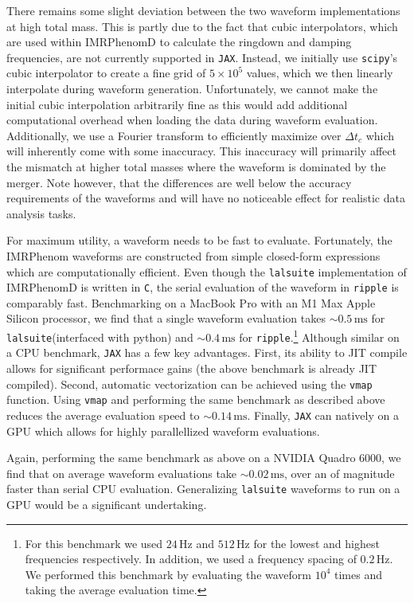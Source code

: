 \documentclass[twocolumn]{aastex631}
\newcommand{\jax}{\texttt{JAX}\xspace}
\newcommand{\ripple}{\texttt{ripple}\xspace}
\newcommand{\lalsuite}{\texttt{lalsuite}\xspace}
\begin{document}
There remains some slight deviation between the two waveform implementations at high total mass. 
This is partly due to the fact that cubic interpolators, which are used within IMRPhenomD to calculate the ringdown and damping frequencies, are not currently supported in \jax. 
Instead, we initially use \texttt{scipy}'s cubic interpolator to create a fine grid of $5\times10^5$ values, which we then linearly interpolate during waveform generation.
Unfortunately, we cannot make the initial cubic interpolation arbitrarily fine as this would add additional computational overhead when loading the data during waveform evaluation.
Additionally, we use a Fourier transform to efficiently maximize over $\Delta t_c$ which will inherently come with some inaccuracy.
This inaccuracy will primarily affect the mismatch at higher total masses where the waveform is dominated by the merger.
Note however, that the differences are well below the accuracy requirements of the waveforms and will have no noticeable effect for realistic data analysis tasks.

For maximum utility, a waveform needs to be fast to evaluate.
Fortunately, the IMRPhenom waveforms are constructed from simple closed-form expressions which are computationally efficient.
Even though the \lalsuite implementation of IMRPhenomD is written in \texttt{C}, the serial evaluation of the waveform in \ripple is comparably fast. 
Benchmarking on a MacBook Pro with an M1 Max Apple Silicon processor, we find that a single waveform evaluation takes $\sim 0.5\,\mathrm{ms}$ for \lalsuite (interfaced with python) and $\sim 0.4\,\mathrm{ms}$ for \ripple.\footnote{
    For this benchmark we used $24\,\mathrm{Hz}$ and $512\,\mathrm{Hz}$ for the lowest and highest frequencies respectively. 
    In addition, we used a frequency spacing of $0.2\,\mathrm{Hz}$. 
    We performed this benchmark by evaluating the waveform $10^{4}$ times and taking the average evaluation time.
}
Although similar on a CPU benchmark, \jax has a few key advantages. 
First, its ability to JIT compile allows for significant performace gains (the above benchmark is already JIT compiled).
Second, automatic vectorization can be achieved using the \texttt{vmap} function.
Using \texttt{vmap} and performing the same benchmark as described above reduces the average evaluation speed to $\sim 0.14\,\mathrm{ms}$.
Finally, \jax can natively on a GPU which allows for highly parallellized waveform evaluations.

Again, performing the same benchmark as above on a NVIDIA Quadro 6000, we find that on average waveform evaluations take $\sim 0.02\,\mathrm{ms}$, over an of magnitude faster than serial CPU evaluation.
Generalizing \lalsuite waveforms to run on a GPU would be a significant undertaking.
\end{document}
